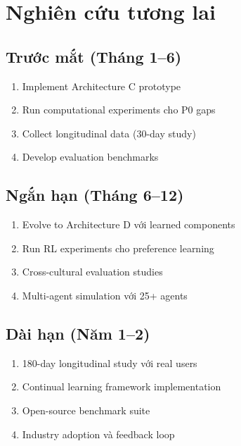 \section{Nghiên cứu tương lai}

\subsection{Trước mắt (Tháng 1--6)}

\begin{enumerate}
    \item Implement Architecture C prototype
    \item Run computational experiments cho P0 gaps
    \item Collect longitudinal data (30-day study)
    \item Develop evaluation benchmarks
\end{enumerate}

\subsection{Ngắn hạn (Tháng 6--12)}

\begin{enumerate}
    \item Evolve to Architecture D với learned components
    \item Run RL experiments cho preference learning
    \item Cross-cultural evaluation studies
    \item Multi-agent simulation với 25+ agents
\end{enumerate}

\subsection{Dài hạn (Năm 1--2)}

\begin{enumerate}
    \item 180-day longitudinal study với real users
    \item Continual learning framework implementation
    \item Open-source benchmark suite
    \item Industry adoption và feedback loop
\end{enumerate}

